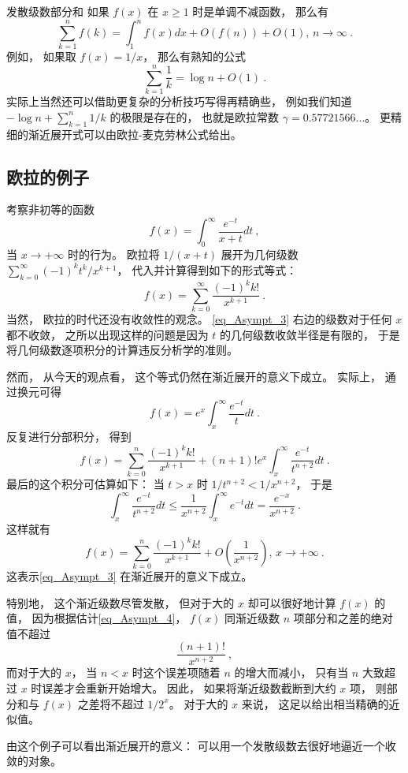 \begin{example}{发散级数部分和}
如果 $f(x)$ 在 $x\geq1$ 时是单调不减函数， 那么有
$$
\sum_{k=1}^nf(k)=\int_1^n f(x)dx+O(f(n))+O(1),\,n\to\infty~.
$$
例如， 如果取 $f(x)=1/x$， 那么有熟知的公式
$$
\sum_{k=1}^n\frac{1}{k}=\log n+O(1)~.
$$
实际上当然还可以借助更复杂的分析技巧写得再精确些， 例如我们知道 $-\log n+\sum_{k=1}^n1/k$ 的极限是存在的， 也就是欧拉常数 $\gamma=0.57721566...$。 更精细的渐近展开式可以由欧拉-麦克劳林公式给出。
\end{example}

\subsection{欧拉的例子}
考察非初等的函数
$$
f(x)=\int_0^\infty\frac{e^{-t}}{x+t}dt~,
$$
当 $x\to+\infty$ 时的行为。 欧拉将 $1/(x+t)$ 展开为几何级数
$\sum_{k=0}^\infty {(-1)^kt^k}/{x^{k+1}}$， 
代入并计算得到如下的形式等式：
\begin{equation}\label{eq_Asympt_3}
f(x)=\sum_{k=0}^\infty\frac{(-1)^kk!}{x^{k+1}}~.
\end{equation}
当然， 欧拉的时代还没有收敛性的观念。 \autoref{eq_Asympt_3} 右边的级数对于任何 $x$ 都不收敛， 之所以出现这样的问题是因为 $t$ 的几何级数收敛半径是有限的， 于是将几何级数逐项积分的计算违反分析学的准则。 

然而， 从今天的观点看， 这个等式仍然在渐近展开的意义下成立。 实际上， 通过换元可得
$$
f(x)=e^{x}\int_x^\infty \frac{e^{-t}}{t}dt~.
$$
反复进行分部积分， 得到
$$
f(x)=\sum_{k=0}^n\frac{(-1)^kk!}{x^{k+1}}
+(n+1)!e^x\int_x^\infty\frac{e^{-t}}{t^{n+2}}dt~.
$$
最后的这个积分可估算如下： 当 $t>x$ 时 $1/t^{n+2}<1/x^{n+2}$， 于是
\begin{equation}\label{eq_Asympt_4}
\int_x^\infty\frac{e^{-t}}{t^{n+2}}dt
\leq\frac{1}{x^{n+2}}\int_x^\infty e^{-t}dt
=\frac{e^{-x}}{x^{n+2}}~.
\end{equation}
这样就有
$$
f(x)=\sum_{k=0}^n\frac{(-1)^kk!}{x^{k+1}}
+O\left(\frac{1}{x^{n+2}}\right),\,x\to+\infty~.
$$
这表示\autoref{eq_Asympt_3} 在渐近展开的意义下成立。 

特别地， 这个渐近级数尽管发散， 但对于大的 $x$ 却可以很好地计算 $f(x)$ 的值， 因为根据估计\autoref{eq_Asympt_4}， $f(x)$ 同渐近级数 $n$ 项部分和之差的绝对值不超过
$$
\frac{(n+1)!}{x^{n+2}}~,
$$
而对于大的 $x$， 当 $n<x$ 时这个误差项随着 $n$ 的增大而减小， 只有当 $n$ 大致超过 $x$ 时误差才会重新开始增大。 因此， 如果将渐近级数截断到大约 $x$ 项， 则部分和与 $f(x)$ 之差将不超过 $1/2^x$。 对于大的 $x$ 来说， 这足以给出相当精确的近似值。 

由这个例子可以看出渐近展开的意义： 可以用一个发散级数去很好地逼近一个收敛的对象。
